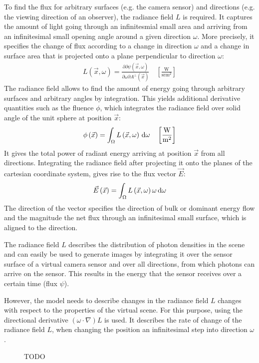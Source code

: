 To find the flux for arbitrary surfaces (e.g. the camera sensor) and directions (e.g. the viewing direction of an observer), the radiance field $L$ is required. It captures the amount of light going through an infinitesmial small area and arriving from an infinitesimal small opening angle around a given direction $\omega$. More precisely, it specifies the change of flux according to a change in direction $\omega$ and a change in surface area that is projected onto a plane perpendicular to direction $\omega$:
\begin{align*}
L\left(\vec{x}, \omega\right) = \frac{\partial\partial\psi\left(\vec{x}, \omega\right)}{\partial\omega\partial A^\perp\left(\vec{x}\right)}
\quad
\left[\frac{\si{\watt}}{\si{\steradian} \si{\meter}^2}\right]
\end{align*}
The radiance field allows to find the amount of energy going through arbitrary surfaces and arbitrary angles by integration. This yields additional derivative quantities such as the fluence $\phi$, which integrates the radiance field over solid angle of the unit sphere at position $\vec{x}$:
\begin{align*}
\phi\left(\vec{x}\right) = \int_\Omega L\left(\vec{x}, \omega\right) \,\mathrm{d}\omega
\quad
\left[\frac{\si{\watt}}{\si{\meter}^2}\right]
\end{align*}
It gives the total power of radiant energy arriving at position $\vec{x}$ from all directions. Integrating the radiance field after projecting it onto the planes of the cartesian coordinate system, gives rise to the flux vector $\vec{E}$:
\begin{align*}
\vec{E}\left(\vec{x}\right) = \int_\Omega L\left(\vec{x}, \omega\right)\omega \,\mathrm{d}\omega
\end{align*}
The direction of the vector specifies the direction of bulk or dominant energy flow and the magnitude the net flux through an infinitesimal small surface, which is aligned to the direction.

The radiance field $L$ describes the distribution of photon densities in the scene and can easily be used to generate images by integrating it over the sensor surface of a virtual camera sensor and over all directions, from which photons can arrive on the sensor. This results in the energy that the sensor receives over a certain time (flux $\psi$).


However, the model needs to describe changes in the radiance field $L$ changes with respect to the properties of the virtual scene. For this purpose, using the directional derivative $\left(\omega\cdot\nabla\right)L$ is used. It describes the rate of change of the radiance field $L$, when changing the position an infinitesimal step into direction $\omega$.
\begin{figure}[h]
\centering
{}
\caption{TODO}
\label{fig:rte_change_of_L}
\end{figure}

